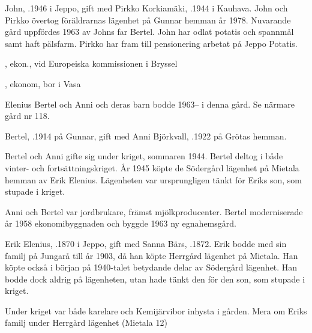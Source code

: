 John, .1946 i Jeppo, gift med Pirkko Korkiamäki, .1944 i Kauhava. John och Pirkko övertog föräldrarnas lägenhet på Gunnar hemman år 1978. Nuvarande gård uppfördes 1963 av Johns far Bertel. John har odlat potatis och spannmål samt haft pälsfarm. Pirkko har fram till pensionering arbetat på Jeppo Potatis.

\begin{jhchildren}
  \item {}, ekon., vid Europeiska kommissionen i Bryssel
  \item {}, ekonom, bor i Vasa
\end{jhchildren}


Elenius Bertel och Anni och deras barn bodde 1963-- i denna gård. Se närmare gård nr 118.




Bertel, .1914 på Gunnar, gift med Anni Björkvall, .1922 på Grötas hemman.
\begin{jhchildren}
  \item {}
  \item {}
\end{jhchildren}
Bertel och Anni gifte sig under kriget, sommaren 1944. Bertel deltog i både vinter- och fortsättningskriget. År 1945 köpte de Södergård lägenhet på Mietala hemman av Erik Elenius. Lägenheten var ursprungligen tänkt för Eriks son, som stupade i kriget.

Anni och Bertel var jordbrukare, främst mjölkproducenter. Bertel moderniserade år 1958 ekonomibyggnaden och byggde 1963 ny egnahemsgård.


Erik Elenius, .1870 i Jeppo, gift med Sanna Bärs, .1872. Erik bodde med sin familj på Jungarå till år 1903, då han köpte Herrgård lägenhet på Mietala. Han köpte också i början på 1940-talet betydande delar av Södergård lägenhet. Han bodde dock aldrig på lägenheten, utan hade tänkt den för den son, som stupade i kriget.

Under kriget var både karelare och Kemijärvibor inhysta i gården. Mera om Eriks familj under Herrgård lägenhet (Mietala 12)


